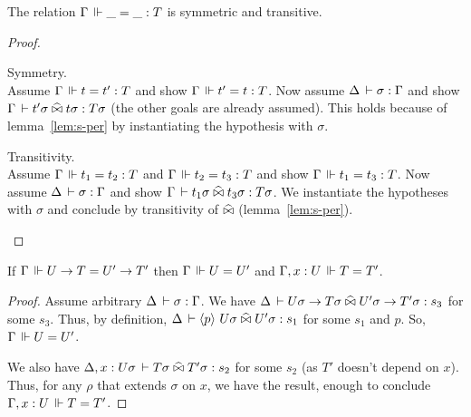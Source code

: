 \documentclass[a4paper,english]{lipics-utf8x}
\begin{document}
  \begin{mathc}
    \qquad
  \end{mathc}

  \begin{lemma}
    The relation $\Gamma \,\Vdash \_ = \_ : T$ is symmetric and transitive.
  \end{lemma}

  \begin{proof}
    \leavevmode
    \begin{caselist}
      \nextcase Symmetry.\\
      Assume $\Gamma \,\Vdash t = t' : T$ and show $\Gamma \,\Vdash t' = t : T$.
      Now assume $\Delta \,\vdash \sigma : \Gamma$ and show
      $\Gamma \,\vdash t' \sigma \mathrel{\widehat{\bowtie}} t \sigma : T \sigma$ (the other goals are
      already assumed). This holds because of lemma~\ref{lem:s-per} by
      instantiating the hypothesis with $\sigma$.

      \nextcase Transitivity.\\
      Assume $\Gamma \,\Vdash t_1 = t_2 : T$ and $\Gamma \,\Vdash t_2 = t_3 : T$ and
      show $\Gamma \,\Vdash t_1 = t_3 : T$.
      Now assume $\Delta \,\vdash \sigma : \Gamma$ and show
      $\Gamma \,\vdash t_1 \sigma \mathrel{\widehat{\bowtie}} t_3 \sigma : T \sigma$.
      We instantiate the hypotheses with $\sigma$ and conclude by transitivity
      of $\mathrel{\widehat{\bowtie}}$ (lemma~\ref{lem:s-per}).
    \end{caselist}
  \end{proof}

  \begin{lemma}
    \label{lem:fun-inj-valid}
    If $\Gamma \,\Vdash U \to T = U' \to T'$ then $\Gamma \,\Vdash U = U'$ and
    $\Gamma, x:U \,\Vdash T = T'$.
  \end{lemma}

  \begin{proof}
    Assume arbitrary $\Delta \,\vdash \sigma : \Gamma$.
    We have
    $\Delta \,\vdash U \sigma \to T\sigma \mathrel{\widehat{\bowtie}} U'\sigma \to T' \sigma : s_3$
    for some $s_3$. Thus, by definition,
    $\Delta \,\vdash \langle p \rangle~ U \sigma \mathrel{\widehat{\bowtie}} U' \sigma : s_1$ for some $s_1$ and
    $p$. So, $\Gamma \,\Vdash U = U'$.

    We also have
    $\Delta, x:U\sigma \,\vdash T \sigma \mathrel{\widehat{\bowtie}} T'\sigma : s_2$ for some $s_2$
    (as $T'$ doesn't depend on $x$).
    Thus, for any $\rho$ that extends $\sigma$ on $x$, we have the result,
    enough to conclude $\Gamma, x:U \,\Vdash T = T'$.
  \end{proof}
\end{document}
